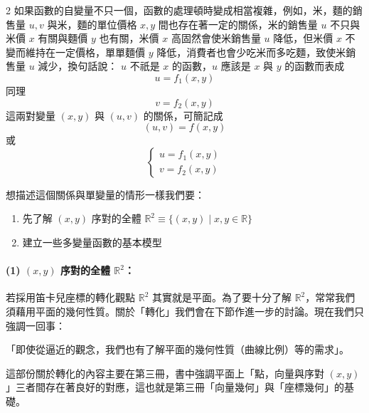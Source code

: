 \begin{paracol}{2}
如果函數的自變量不只一個，函數的處理頓時變成相當複雜，例如，米，麵的銷售量 $u, v$ 與米，麵的單位價格 $x, y$ 間也存在著一定的關係，米的銷售量 $u$ 不只與米價 $x$ 有關與麵價 $y$ 也有關，米價 $x$ 高固然會使米銷售量 $u$ 降低，但米價 $x$ 不變而維持在一定價格，單單麵價 $y$ 降低，消費者也會少吃米而多吃麵，致使米銷售量 $u$ 減少，換句話說：
$u$ 不祇是 $x$ 的函數，$u$ 應該是 $x$ 與 $y$ 的函數而表成
\[ u = f_1(x, y) \]
同理
\[ v = f_2(x, y) \]
這兩對變量 $(x,y)$ 與 $(u,v)$ 的關係，可簡記成
\[ (u, v) = f(x, y) \]
或
\[ \begin{cases} u = f_1(x, y) \\ v = f_2(x, y) \end{cases} \]

想描述這個關係與單變量的情形一樣我們要：
\begin{enumerate}[label=(\arabic*), leftmargin=2em]
  \item 先了解 $(x,y)$ 序對的全體 $\mathbb{R}^2 \equiv \{ (x,y) \mid x, y \in \mathbb{R} \}$
  \item 建立一些多變量函數的基本模型
\end{enumerate}

\paragraph{(1) $(x,y)$ 序對的全體 $\mathbb{R}^2$：} 若採用笛卡兒座標的轉化觀點 $\mathbb{R}^2$ 其實就是平面。為了要十分了解 $\mathbb{R}^2$，常常我們須藉用平面的幾何性質。關於「轉化」我們會在下節作進一步的討論。現在我們只強調一回事：

「即使從逼近的觀念，我們也有了解平面的幾何性質（曲線比例）等的需求」。

這部份關於轉化的內容主要在第三冊，書中強調平面上「點，向量與序對 $(x,y)$」三者間存在著良好的對應，這也就是第三冊「向量幾何」與「座標幾何」的基礎。

\switchcolumn


\end{paracol}
